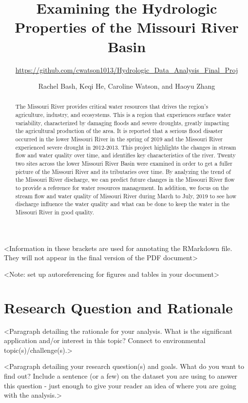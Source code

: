 \documentclass[12pt,]{article}
\title{Examining the Hydrologic Properties of the Missouri River Basin}
\subtitle{\url{https://github.com/cwatson1013/Hydrologic_Data_Analysis_Final_Proj}}
\author{Rachel Bash, Keqi He, Caroline Watson, and Haoyu Zhang}
\date{}
\begin{document}
\maketitle
\begin{abstract}
The Missouri River provides critical water resources that drives the
region's agriculture, industry, and ecosystems. This is a region that
experiences surface water variability, characterized by damaging floods
and severe droughts, greatly impacting the agricultural production of
the area. It is reported that a serious flood disaster occurred in the
lower Missouri River in the spring of 2019 and the Missouri River
experienced severe drought in 2012-2013. This project highlights the
changes in stream flow and water quality over time, and identifies key
characteristics of the river. Twenty two sites across the lower Missouri
River Basin were examined in order to get a fuller picture of the
Missouri River and its tributaries over time. By analyzing the trend of
the Missouri River discharge, we can predict future changes in the
Missouri River flow to provide a reference for water resources
management. In addition, we focus on the stream flow and water quality
of Missouri River during March to July, 2019 to see how discharge
influence the water quality and what can be done to keep the water in
the Missouri River in good quality.
\end{abstract}

\textless{}Information in these brackets are used for annotating the
RMarkdown file. They will not appear in the final version of the PDF
document\textgreater{}

\newpage
\tableofcontents 
\newpage
\listoftables 
\newpage
\listoffigures 
\newpage

\textless{}Note: set up autoreferencing for figures and tables in your
document\textgreater{}

\hypertarget{research-question-and-rationale}{%
\section{Research Question and
Rationale}\label{research-question-and-rationale}}

\textless{}Paragraph detailing the rationale for your analysis. What is
the significant application and/or interest in this topic? Connect to
environmental topic(s)/challenge(s).\textgreater{}

\textless{}Paragraph detailing your research question(s) and goals. What
do you want to find out? Include a sentence (or a few) on the dataset
you are using to answer this question - just enough to give your reader
an idea of where you are going with the analysis.\textgreater{}
\end{document}
